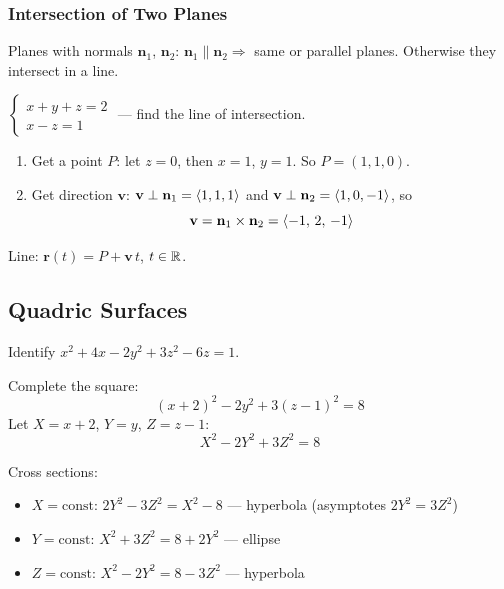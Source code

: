 \subsubsection{Intersection of Two Planes}

Planes with normals $\mathbf{n}_{1}$, $\mathbf{n}_{2}$:
$\mathbf{n}_{1}\parallel\mathbf{n}_{2} \Longrightarrow$ same or parallel planes.
Otherwise they intersect in a line.

\begin{example}
  $
    \begin{cases}
      x+y+z=2 \\ x-z=1
    \end{cases}
  $ --- find the line of intersection.

  \begin{enumerate}
    \item Get a point $P$: let $z=0$, then $x=1$, $y=1$.
          So $P=(1,1,0)$.
    \item Get direction $\mathbf{v}$:
          $\mathbf{v}\perp\mathbf{n}_{1}=\langle 1,1,1 \rangle$ and
          $\mathbf{v}\perp\mathbf{n}_{2}=\langle 1,0,-1 \rangle$, so
          \[
            \mathbf{v} = \mathbf{n}_{1}\times\mathbf{n}_{2}
            = \langle -1,\,2,\,-1 \rangle
          \]
  \end{enumerate}

  Line: $\mathbf{r}(t) = P + \mathbf{v}\,t$, \; $t\in\mathbb{R}$.
\end{example}

\subsection{Quadric Surfaces}

\begin{example}
  Identify $x^{2}+4x-2y^{2}+3z^{2}-6z=1$.

  Complete the square:
  \[
    (x+2)^{2}-2y^{2}+3(z-1)^{2}=8
  \]
  Let $X=x+2$, $Y=y$, $Z=z-1$:
  \[
    X^{2}-2Y^{2}+3Z^{2}=8
  \]

  Cross sections:
  \begin{itemize}[nosep]
    \item $X=\text{const}$: $2Y^{2}-3Z^{2}=X^{2}-8$ --- hyperbola
          (asymptotes $2Y^{2}=3Z^{2}$)
    \item $Y=\text{const}$: $X^{2}+3Z^{2}=8+2Y^{2}$ --- ellipse
    \item $Z=\text{const}$: $X^{2}-2Y^{2}=8-3Z^{2}$ --- hyperbola
  \end{itemize}
\end{example}
